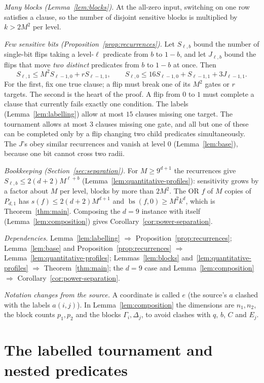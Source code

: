 \documentclass[11pt]{article}
\newcommand{\bs}{\operatorname{bs}}
\theoremstyle{definition}
\theoremstyle{remark}
\begin{document}
\emph{Many blocks (Lemma~\ref{lem:blocks}).} At the all-zero input, switching
on one row satisfies a clause, so the number of disjoint sensitive blocks is
multiplied by $k>2M^2$ per level.

\emph{Few sensitive bits (Proposition~\ref{prop:recurrences}).}
Let $S_{\ell,b}$ bound the number of single-bit flips taking a level-$\ell$
predicate from $b$ to $1-b$, and let $J_{\ell,b}$ bound the flips that move
\emph{two distinct} predicates from $b$ to $1-b$ at once. Then
\[
 S_{\ell,1}\le M^2S_{\ell-1,0}+rS_{\ell-1,1},\qquad
 S_{\ell,0}\le 16S_{\ell-1,0}+S_{\ell-1,1}+3J_{\ell-1,1}.
\]
For the first, fix one true clause; a flip must break one of its $M^2$ gates
or $r$ targets. The second is the heart of the proof. A flip from $0$ to $1$
must complete a clause that currently fails exactly one condition. The labels
(Lemma~\ref{lem:labelling}) allow at most $15$ clauses missing one target.
The tournament allows at most $3$ clauses missing one gate, and all but one
of these can be completed only by a flip changing two child predicates
simultaneously. The $J$'s obey similar recurrences and vanish at level $0$
(Lemma~\ref{lem:base}), because one bit cannot cross two radii.

\emph{Bookkeeping (Section~\ref{sec:separation}).}
For $M\ge9^{d+1}$ the recurrences give $S_{\ell,b}\le2(d+2)M^{\ell+b}$
(Lemma~\ref{lem:quantitative-profiles}): sensitivity grows by a factor about
$M$ per level, blocks by more than $2M^2$. The OR $f$ of $M$ copies of
$P_{d,1}$ has $s(f)\le2(d+2)M^{d+1}$ and $\bs(f,0)\ge M^2k^d$, which is
Theorem~\ref{thm:main}. Composing the $d=9$ instance with itself
(Lemma~\ref{lem:composition}) gives Corollary~\ref{cor:power-separation}.

\emph{Dependencies.}
Lemma~\ref{lem:labelling} $\Rightarrow$ Proposition~\ref{prop:recurrences};
Lemma~\ref{lem:base} and Proposition~\ref{prop:recurrences} $\Rightarrow$
Lemma~\ref{lem:quantitative-profiles};
Lemmas~\ref{lem:blocks} and~\ref{lem:quantitative-profiles} $\Rightarrow$
Theorem~\ref{thm:main}; the $d=9$ case and Lemma~\ref{lem:composition}
$\Rightarrow$ Corollary~\ref{cor:power-separation}.

\emph{Notation changes from the source.} A coordinate is called $e$ (the
source's $a$ clashed with the labels $a(i,j)$). In
Lemma~\ref{lem:composition} the dimensions are $n_1,n_2$, the block counts
$p_1,p_2$ and the blocks $\Gamma_i,\Delta_j$, to avoid clashes with $q$, $b$,
$C$ and $E_j$.

\section{The labelled tournament and nested predicates}
\label{sec:construction}
\end{document}
